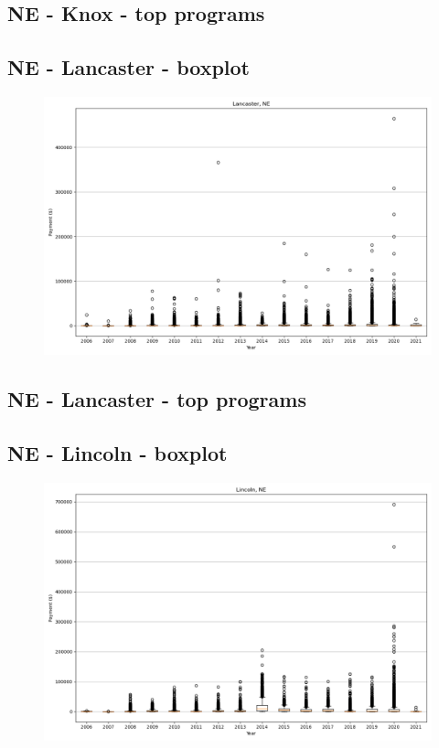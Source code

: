 \subsection*{NE - Knox - top programs}

\newpage
\subsection*{NE - Lancaster - boxplot}
\begin{figure}[h]
\centering
\includegraphics[width=7in]{../output/boxplots/counties/Lancaster-NE_boxplot.png}
\end{figure}


\subsection*{NE - Lancaster - top programs}

\newpage
\subsection*{NE - Lincoln - boxplot}
\begin{figure}[h]
\centering
\includegraphics[width=7in]{../output/boxplots/counties/Lincoln-NE_boxplot.png}
\end{figure}


